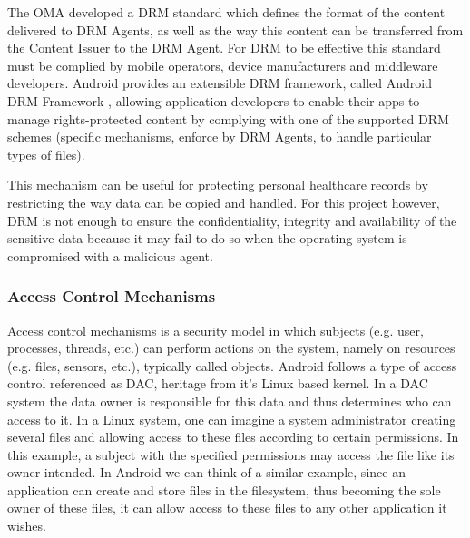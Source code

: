 The \ac{OMA} developed a DRM standard \cite{drm} which defines the format of the content delivered to DRM Agents, as well as the way this content can be transferred from the Content Issuer to the DRM Agent. For DRM to be effective this standard must be complied by mobile operators, device manufacturers and middleware developers. Android provides an extensible DRM framework, called Android DRM Framework \cite{androidDRM}, allowing application developers to enable their apps to manage rights-protected content by complying with one of the supported DRM schemes (specific mechanisms, enforce by DRM Agents, to handle particular types of files).

This mechanism can be useful for protecting personal healthcare records by restricting the way data can be copied and handled. For this project however, DRM is not enough to ensure the confidentiality, integrity and availability of the sensitive data because it may fail to do so when the operating system is compromised with a malicious agent.

\subsubsection{Access Control Mechanisms}

Access control mechanisms is a security model in which subjects (e.g. user, processes, threads, etc.) can perform actions on the system, namely on resources (e.g. files, sensors, etc.), typically called objects. Android follows a type of access control referenced as \ac{DAC}, heritage from it's Linux based kernel. In a \ac{DAC} system the data owner is responsible for this data and thus determines who can access to it. In a Linux system, one can imagine a system administrator creating several files and allowing access to these files according to certain permissions. In this example, a subject with the specified permissions may access the file like its owner intended. In Android we can think of a similar example, since an application can create and store files in the filesystem, thus becoming the sole owner of these files, it can allow access to these files to any other application it wishes.

